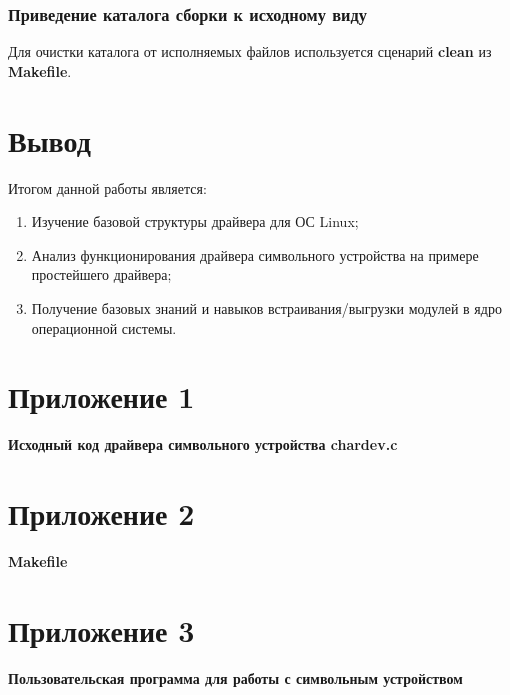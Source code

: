 \subsubsection{Приведение каталога сборки к исходному виду}
Для очистки каталога от исполняемых файлов используется сценарий \textbf{clean} из \textbf{Makefile}.



\nocite{interface}
\nocite{opennet}

\clearpage
\section*{Вывод}
Итогом данной работы является:
\begin{enumerate}
\item Изучение базовой структуры драйвера для ОС Linux;
\item Анализ функционирования драйвера символьного устройства на примере простейшего драйвера;
\item Получение базовых знаний и навыков встраивания/выгрузки модулей в ядро операционной системы.
\end{enumerate}


\clearpage
{}



\clearpage
{}
\setcounter{section}{0}
\section*{Приложение 1} \label{p1:1}
\textbf{Исходный код драйвера символьного устройства chardev.c}


\section*{Приложение 2} \label{p2:1}
\textbf{Makefile}


\section*{Приложение 3} \label{p3:1}
\textbf{Пользовательская программа для работы с символьным устройством}


%
%



